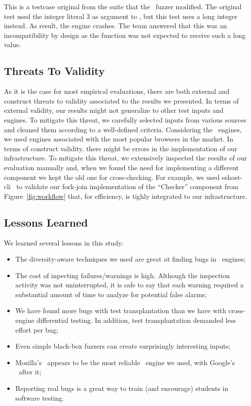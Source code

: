 \documentclass[10pt,conference,anonymous]{IEEEtran}
\begin{document}
This is a testcase original from the \jsc{} suite that the
\radamsa\ fuzzer modified. The original test used the integer literal
3 as argument to , but this test uses a long integer
instead. As result, the engine crashes. The team answered that this
was an incompatibility by design as the function was not expected to
receive such a long value.


\subsection{Threats To Validity}

As it is the case for most empirical evaluations, there are both
external and construct threats to validity associated to the results
we presented. In terms of external validity, our results might not
generalize to other test inputs and engines. To mitigate this threat,
we carefully selected inputs from various sources and cleaned them
according to a well-defined criteria. Considering the \js\ engines, we
used engines associated with the most popular browsers in the
market. In terms of construct validity, there might be errors in the
implementation of our infrastructure. To mitigate this threat, we
extensively inspected the results of our evaluation manually and, when
we found the need for implementing a different component we kept the
old one for cross-checking. For example, we used
eshost-cli~\cite{eshost-cli} to validate our fork-join implementation
of the ``Checker'' component from Figure~\ref{fig:workflow} that, for
efficiency, is tighly integrated to our infrastructure.

\subsection{Lessons Learned}
\label{sec:lessons}

We learned several lessons in this study:

\begin{itemize}
  \item The diversity-aware techniques we used are great
    at finding bugs in \js\ engines;
  \item The cost of inpecting failures/warnings is high. Although the
    inspection activity was not uninterrupted, it is safe to say that
    each warning required a substantial amount of time to analyze for
    potential false alarms;
  \item We have found more bugs with test transplantation than we have
    with cross-engine differential testing. In addition, test
    transplantation demanded less effort per bug;
  \item Even simple black-box fuzzers can create surprisingly
    interesting inputs;
  \item Mozilla's \smonkey\ appears to be the most reliable
    \js\ engine we used, with Google's \veight\ after it;
  \item Reporting real bugs is a great way to train (and encourage)
    students in software testing.
\end{itemize}
\end{document}
